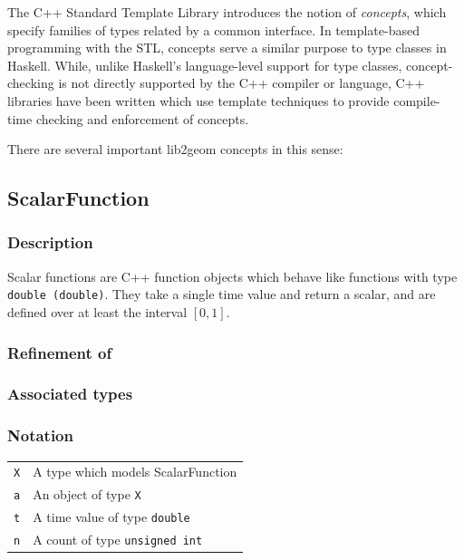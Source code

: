 \documentclass[openany]{book}
\begin{document}
The C++ Standard Template Library\cite{stl} introduces the notion of
\emph{concepts}\cite{stl_concepts}, which specify families of types related
by a common interface.  In template-based programming with the STL, concepts
serve a similar purpose to type classes in Haskell.  While, unlike Haskell's
language-level support for type classes, concept-checking is not directly
supported by the C++ compiler or language, C++ libraries have been written
which use template techniques to provide compile-time checking and enforcement
of concepts\cite{boost_concept_check}.

There are several important lib2geom concepts in this sense:

\subsection{ScalarFunction}

\subsubsection{Description}

Scalar functions are C++ function objects which behave like functions
with type {\tt double (double)}.  They take a single time value and return
a scalar, and are defined over at least the interval $[0, 1]$.

\subsubsection{Refinement of}

\subsubsection{Associated types}

\subsubsection{Notation}

\begin{tabular}{r l}
  {\tt X} & A type which models ScalarFunction \\
  {\tt a} & An object of type {\tt X} \\
  {\tt t} & A time value of type {\tt double} \\
  {\tt n} & A count of type {\tt unsigned int} \\
\end{tabular}
\end{document}
